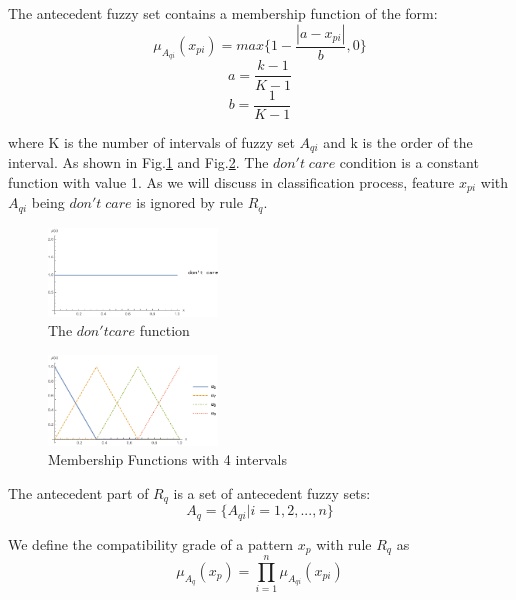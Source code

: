 \documentclass[conference]{IEEEtran}
\begin{document}
  The antecedent fuzzy set contains a membership function of the form:
  \begin{equation}
    \mu_{A_{qi}}(x_{pi}) =max\{1-\frac{|a-x_{pi}|}
  {b},0\}
  \end{equation}
  \begin{equation}
    a=\frac{k-1}{K-1}
  \end{equation}
  \begin{equation}
  b=\frac{1}{K-1}
  \end{equation}
  
  where K is the number of intervals of fuzzy set $A_{qi}$ and k is the order of the interval. As shown in Fig.\ref{u0} and Fig.\ref{u3}. The $don't\;care$ condition is a constant function with value 1. As we will discuss in classification process, feature $x_{pi} $ with $A_{qi}$ being $don't\;care$ is ignored by rule $R_q$. 

  \begin{figure}[H]
 	\centering
 	\includegraphics[width=0.4\textwidth]{figures/u1.png}
   \caption{The $don't care$ function}\label{fig:digit}
   \label{u0}
 \end{figure}
 \begin{figure}[H]
 	\centering
 	\includegraphics[width=0.4\textwidth]{figures/u4.png}
   \caption{Membership Functions with 4 intervals}\label{fig:digit}
   \label{u3}
 \end{figure}
  The antecedent part of $R_q$ is a set of antecedent fuzzy sets:
\begin{equation}A_q = \{A_{qi}|i = 1,2,...,n\}\end{equation}

  We define the compatibility grade of a pattern $x_p$ with rule $R_q$ as
  \begin{equation}\mu_{A_q}(x_p) = \prod_{i = 1}^{n}\mu_{A_{qi}}(x_{pi})\end{equation}
\end{document}
